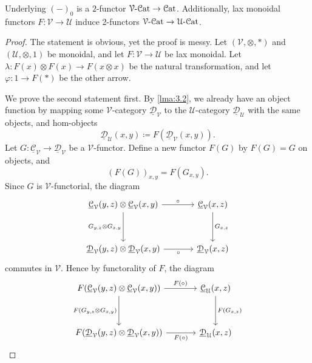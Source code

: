 \begin{proposition}\label{prp:3.1}
	Underlying $(-)_0$ is a $2$-functor $\mathcal{V} \text{-} \mathcal{C}\mathrm{at} \to \mathcal{C}\mathrm{at} $. Additionally, lax monoidal functors $F : \mathcal{V}  \to \mathcal{U}$ induce 2-functors $\mathcal{V} \text{-} \mathcal{C}\mathrm{at} \to \mathcal{U} \text{-} \mathcal{C}\mathrm{at}$.
\end{proposition}
\begin{proof}
	The statement is obvious, yet the proof is messy. Let $(\mathcal{V} ,\otimes ,*)$ and $(\mathcal{U} ,\otimes ,1)$ be monoidal, and let $F : \mathcal{V}  \to \mathcal{U} $ be lax monoidal. Let $\lambda : F(x)\otimes F(x)\to F(x\otimes x)$ be the natural transformation, and let $\varphi : 1 \to F(*)$ be the other arrow.

	We prove the second statement first. By \cref{lma:3.2}, we already have an object function by mapping some $\mathcal{V} $-category $\underline{\mathcal{D} } _\mathcal{V} $ to the $\mathcal{U} $-category $\underline{\mathcal{D} } _\mathcal{U} $ with the same objects, and hom-objects
	\[
		\underline{\mathcal{D} } _\mathcal{U} (x,y)\coloneqq F\left( \underline{\mathcal{D} } _\mathcal{V} (x,y) \right) 
	.\]
	Let $G : \underline{\mathcal{C} }_\mathcal{V}  \to \underline{\mathcal{D} } _\mathcal{V} $ be a $\mathcal{V} $-functor. Define a new functor $F(G)$ by $F(G)=G$ on objects, and
	\[
		(F(G))_{x,y} =F(G_{x,y} )
	.\]
	Since $G$ is $\mathcal{V} $-functorial, the diagram
	\[\begin{tikzcd}[row sep = 3.5em, column sep = 3.5em]
	\underline{\mathcal{C} } _\mathcal{V} (y,z)\otimes \underline{\mathcal{C} } _\mathcal{V} (x,y)\ar[" \circ  ", r] \ar[" G_{y\text{,} z} \otimes G_{x\text{,} y}  "', d]  & \underline{\mathcal{C} } _\mathcal{V} (x,z)\ar[" G_{x\text{,} z}  ", d]  \\
	\underline{\mathcal{D} } _\mathcal{V} (y,z)\otimes \underline{\mathcal{D} } _\mathcal{V} (x,y)\ar[" \circ  "', r]  & \underline{\mathcal{D} } _\mathcal{V} (x,z)
	\end{tikzcd}\]
	commutes in $\mathcal{V} $. Hence by functorality of $F$, the diagram
	\[\begin{tikzcd}[row sep = 3.5em, column sep = 3.5em]
	F(\underline{\mathcal{C} } _\mathcal{V} (y,z)\otimes \underline{\mathcal{C} } _\mathcal{V} (x,y))\ar[" F(\circ ) ", r] \ar[" F(G_{y\text{,} z} \otimes G_{x\text{,} y} ) "', d]  & \underline{\mathcal{C} } _\mathcal{U} (x,z)\ar[" F(G_{x\text{,} z} ) ", d]  \\
	F(\underline{\mathcal{D} } _\mathcal{V} (y,z)\otimes \underline{\mathcal{D} } _\mathcal{V} (x,y))\ar[" F(\circ ) "', r]  & \underline{\mathcal{D} } _\mathcal{U} (x,z)

\end{tikzcd}\]
\end{proof}
